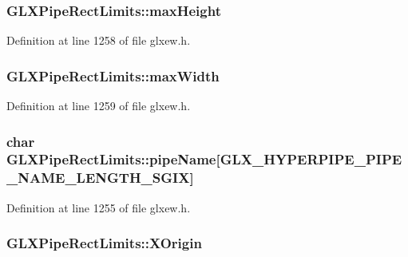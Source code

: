 \subsubsection[{max\+Height}]{ G\+L\+X\+Pipe\+Rect\+Limits\+::max\+Height}\label{struct_g_l_x_pipe_rect_limits_a27572e499c0d3280031c2ad8e387c0c1}


Definition at line 1258 of file glxew.\+h.

\hypertarget{struct_g_l_x_pipe_rect_limits_a8662c7a712b30620e25fc994adf337a1}{}
\subsubsection[{max\+Width}]{ G\+L\+X\+Pipe\+Rect\+Limits\+::max\+Width}\label{struct_g_l_x_pipe_rect_limits_a8662c7a712b30620e25fc994adf337a1}


Definition at line 1259 of file glxew.\+h.

\hypertarget{struct_g_l_x_pipe_rect_limits_ae78b4b6656101bc841946733a5b6e5ce}{}
\subsubsection[{pipe\+Name}]{\setlength{\rightskip}{0pt plus 5cm}char G\+L\+X\+Pipe\+Rect\+Limits\+::pipe\+Name\mbox{[}{\bf G\+L\+X\+\_\+\+H\+Y\+P\+E\+R\+P\+I\+P\+E\+\_\+\+P\+I\+P\+E\+\_\+\+N\+A\+M\+E\+\_\+\+L\+E\+N\+G\+T\+H\+\_\+\+S\+G\+I\+X}\mbox{]}}\label{struct_g_l_x_pipe_rect_limits_ae78b4b6656101bc841946733a5b6e5ce}


Definition at line 1255 of file glxew.\+h.

\hypertarget{struct_g_l_x_pipe_rect_limits_a3e5a965059d9f5d2ca42acd35af5bb9b}{}
\subsubsection[{X\+Origin}]{ G\+L\+X\+Pipe\+Rect\+Limits\+::\+X\+Origin}\label{struct_g_l_x_pipe_rect_limits_a3e5a965059d9f5d2ca42acd35af5bb9b}


